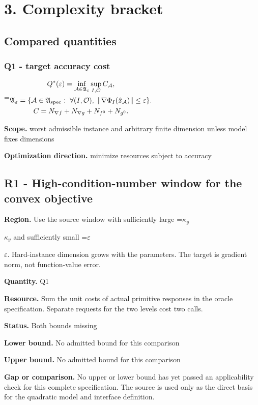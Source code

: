 \documentclass[10pt,a4paper]{article}
\newcommand{\AtlasMath}[1]{\par\begingroup\centering\setbox0=\hbox{$\displaystyle #1$}\ifdim\wd0>1.4\linewidth\typeout{ATLAS WIDE FORMULA: \the\wd0}\fi\ifdim\wd0>\linewidth\resizebox{\linewidth}{!}{\box0}\else\box0\fi\par\endgroup}
\newcommand{\AtlasInlineMath}[1]{\begingroup\setbox0=\hbox{$#1$}\ifdim\wd0>.4\linewidth\endgroup\AtlasMath{#1}\else\endgroup$#1$\fi}
\begin{document}
\section{3. Complexity bracket}
\subsection{Compared quantities}
\subsubsection{Q1 - target accuracy cost}
\AtlasMath{\begin{gathered}Q^*(\varepsilon)=\inf_{\mathcal A\in\mathfrak A_\varepsilon}\sup_{I,\mathcal O}C_{\mathcal A},\\\mathfrak A_\varepsilon=\{\mathcal A\in\mathfrak A_{\rm spec}:\ \forall(I,\mathcal O),\ \|\nabla\Phi_I(\hat x_{\mathcal A})\|\le\varepsilon\}.\\C=N_{\nabla f}+N_{\nabla g}+N_{f^0}+N_{g^0}.\end{gathered}}
\textbf{Scope.} worst admissible instance and arbitrary finite dimension unless model fixes dimensions

\textbf{Optimization direction.} minimize resources subject to accuracy

\subsection{R1 - High-condition-number window for the convex objective}
\textbf{Region.} Use the source window with sufficiently large \AtlasInlineMath{\kappa_y} and sufficiently small \AtlasInlineMath{\varepsilon}. Hard-instance dimension grows with the parameters. The target is gradient norm, not function-value error.

\textbf{Quantity.} Q1

\textbf{Resource.} Sum the unit costs of actual primitive responses in the oracle specification. Separate requests for the two levels cost two calls.

\textbf{Status.} Both bounds missing

\textbf{Lower bound.} No admitted bound for this comparison

\textbf{Upper bound.} No admitted bound for this comparison

\textbf{Gap or comparison.} No upper or lower bound has yet passed an applicability check for this complete specification. The source is used only as the direct basis for the quadratic model and interface definition.
\end{document}

